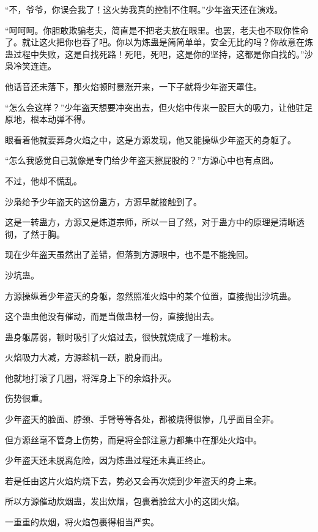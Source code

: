 
\begin{this_body}

“不，爷爷，你误会我了！这火势我真的控制不住啊。”少年盗天还在演戏。

“呵呵呵。你胆敢欺骗老夫，简直是不把老夫放在眼里。也罢，老夫也不取你性命了。就让这火把你也吞了吧。你以为炼蛊是简简单单，安全无比的吗？你故意在炼蛊过程中失败，这是自找死路！死吧，死吧，这是你的坚持，这都是你自找的。”沙枭冷笑连连。

他话音还未落下，那火焰顿时暴涨开来，一下子就将少年盗天罩住。

“怎么会这样？”少年盗天想要冲突出去，但火焰中传来一股巨大的吸力，让他驻足原地，根本动弹不得。

眼看着他就要葬身火焰之中，这是方源发现，他又能操纵少年盗天的身躯了。

“怎么我感觉自己就像是专门给少年盗天擦屁股的？”方源心中也有点囧。

不过，他却不慌乱。

沙枭给予少年盗天的这份蛊方，方源早就接触到了。

这是一转蛊方，方源又是炼道宗师，所以一目了然，对于蛊方中的原理是清晰透彻，了然于胸。

现在少年盗天虽然出了差错，但落到方源眼中，也不是不能挽回。

沙坑蛊。

方源操纵着少年盗天的身躯，忽然照准火焰中的某个位置，直接抛出沙坑蛊。

这个蛊虫他没有催动，而是当做蛊材一份，直接抛出去。

蛊身躯孱弱，顿时吸引了火焰过去，很快就烧成了一堆粉末。

火焰吸力大减，方源趁机一跃，脱身而出。

他就地打滚了几圈，将浑身上下的余焰扑灭。

伤势很重。

少年盗天的脸面、脖颈、手臂等等各处，都被烧得很惨，几乎面目全非。

但方源丝毫不管身上伤势，而是将全部注意力都集中在那处火焰中。

少年盗天还未脱离危险，因为炼蛊过程还未真正终止。

若是任由这片火焰灼烧下去，势必又会再次烧到少年盗天的身上来。

所以方源催动炊烟蛊，发出炊烟，包裹着脸盆大小的这团火焰。

一重重的炊烟，将火焰包裹得相当严实。


\end{this_body}
